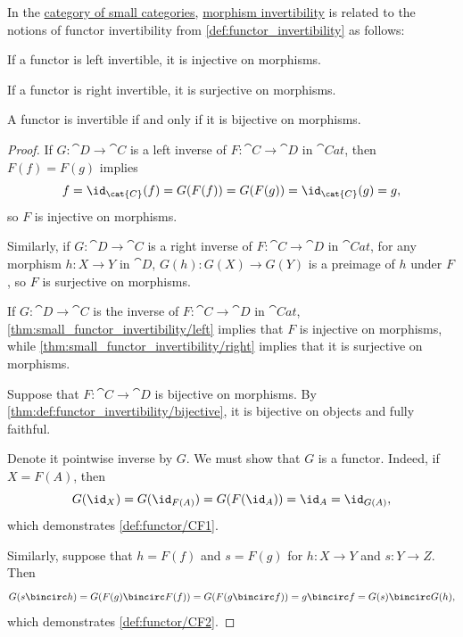 \begin{proposition}\label{thm:small_functor_invertibility}
  In the \hyperref[def:category_of_small_categories]{category of small categories}, \hyperref[def:morphism_invertibility]{morphism invertibility} is related to the notions of functor invertibility from \cref{def:functor_invertibility} as follows:
  \begin{thmenum}
     If a functor is left invertible, it is injective on morphisms.

     If a functor is right invertible, it is surjective on morphisms.

     A functor is invertible if and only if it is bijective on morphisms.
  \end{thmenum}
\end{proposition}
\begin{proof}
   If \( G: \cat{D} \to \cat{C} \) is a left inverse of \( F: \cat{C} \to \cat{D} \) in \( \cat{Cat} \), then \( F(f) = F(g) \) implies
  \begin{equation*}
    f = \id_{\cat{C}}(f) = G(F(f)) = G(F(g)) = \id_{\cat{C}}(g) = g,
  \end{equation*}
  so \( F \) is injective on morphisms.

   Similarly, if \( G: \cat{D} \to \cat{C} \) is a right inverse of \( F: \cat{C} \to \cat{D} \) in \( \cat{Cat} \), for any morphism \( h: X \to Y \) in \( \cat{D} \), \( G(h): G(X) \to G(Y) \) is a preimage of \( h \) under \( F \), so \( F \) is surjective on morphisms.


  \SufficiencySubProof* If \( G: \cat{D} \to \cat{C} \) is the inverse of \( F: \cat{C} \to \cat{D} \) in \( \cat{Cat} \), \cref{thm:small_functor_invertibility/left} implies that \( F \) is injective on morphisms, while \cref{thm:small_functor_invertibility/right} implies that it is surjective on morphisms.

  \NecessitySubProof* Suppose that \( F: \cat{C} \to \cat{D} \) is bijective on morphisms. By \cref{thm:def:functor_invertibility/bijective}, it is bijective on objects and fully faithful.

  Denote it pointwise inverse by \( G \). We must show that \( G \) is a functor. Indeed, if \( X = F(A) \), then
  \begin{equation*}
    G(\id_X) = G(\id_{F(A)}) = G(F(\id_A)) = \id_A = \id_{G(A)},
  \end{equation*}
  which demonstrates \ref{def:functor/CF1}.

  Similarly, suppose that \( h = F(f) \) and \( s = F(g) \) for \( h: X \to Y \) and \( s: Y \to Z \). Then
  \begin{equation*}
    G(s \bincirc h) = G(F(g) \bincirc F(f)) = G(F(g \bincirc f)) = g \bincirc f = G(s) \bincirc G(h),
  \end{equation*}
  which demonstrates \ref{def:functor/CF2}.
\end{proof}

